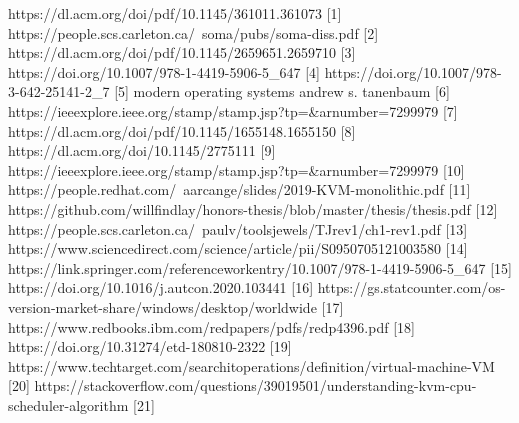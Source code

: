 \documentclass{report}
\begin{document}
\begin{spacing}{1.5}
{\large
https://dl.acm.org/doi/pdf/10.1145/361011.361073 [1]
https://people.scs.carleton.ca/~soma/pubs/soma-diss.pdf [2]
https://dl.acm.org/doi/pdf/10.1145/2659651.2659710 [3]
https://doi.org/10.1007/978-1-4419-5906-5\_647 [4]
https://doi.org/10.1007/978-3-642-25141-2\_7 [5]
modern operating systems andrew s. tanenbaum [6]
https://ieeexplore.ieee.org/stamp/stamp.jsp?tp=\&arnumber=7299979 [7]
https://dl.acm.org/doi/pdf/10.1145/1655148.1655150 [8]
https://dl.acm.org/doi/10.1145/2775111 [9]
https://ieeexplore.ieee.org/stamp/stamp.jsp?tp=\&arnumber=7299979 [10]
https://people.redhat.com/~aarcange/slides/2019-KVM-monolithic.pdf [11]
https://github.com/willfindlay/honors-thesis/blob/master/thesis/thesis.pdf [12]
https://people.scs.carleton.ca/~paulv/toolsjewels/TJrev1/ch1-rev1.pdf [13]
https://www.sciencedirect.com/science/article/pii/S0950705121003580 [14]
https://link.springer.com/referenceworkentry/10.1007/978-1-4419-5906-5\_647 [15]
https://doi.org/10.1016/j.autcon.2020.103441 [16]
https://gs.statcounter.com/os-version-market-share/windows/desktop/worldwide [17]
https://www.redbooks.ibm.com/redpapers/pdfs/redp4396.pdf [18]
https://doi.org/10.31274/etd-180810-2322 [19]
https://www.techtarget.com/searchitoperations/definition/virtual-machine-VM [20]
https://stackoverflow.com/questions/39019501/understanding-kvm-cpu-scheduler-algorithm [21]
}
\end{spacing}
\end{document}
